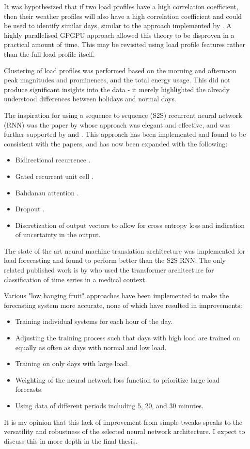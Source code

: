 It was hypothesized that if two load profiles have a high correlation coefficient, then their weather profiles will also have a high correlation coefficient and could be used to identify similar days, similar to the approach implemented by \cite{Bennett2014}.
A highly parallelised GPGPU approach allowed this theory to be disproven in a practical amount of time.
This may be revisited using load profile features rather than the full load profile itself.

Clustering of load profiles was performed based on the morning and afternoon peak magnitudes and prominences, and the total energy usage.
This did not produce significant insights into the data - it merely highlighted the already understood differences between holidays and normal days.

The inspiration for using a sequence to sequence (S2S) recurrent neural network (RNN) was the paper by \cite{Marino2016} whose approach was elegant and effective, and was further supported by \cite{Bianchi2017} and \cite{Kong2017}.
This approach has been implemented and found to be consistent with the papers, and has now been expanded with the following:
\begin{itemize}
	\item Bidirectional recurrence \citep{Schuster1997}.
	\item Gated recurrent unit cell \citep{Cho2014}.
	\item Bahdanau attention \citep{BahdanauCB14}.
	\item Dropout \citep{srivastava14a}.
	\item Discretization of output vectors to allow for cross entropy loss and indication of uncertainty in the output.
\end{itemize}

The state of the art neural machine translation architecture was implemented for load forecasting \citep{Vaswani2017} and found to perform better than the S2S RNN. The only related published work is by  \cite{Song2017} who used the transformer architecture for classification of time series in a medical context.

Various "low hanging fruit" approaches have been implemented to make the forecasting system more accurate, none of which have resulted in improvements:
\begin{itemize}
	\item Training individual systems for each hour of the day.
	\item Adjusting the training process such that days with high load are trained on equally as often as days with normal and low load.
	\item Training on only days with large load.
	\item Weighting of the neural network loss function to prioritize large load forecasts.
	\item Using data of different periods including 5, 20, and 30 minutes.
\end{itemize}
It is my opinion that this lack of improvement from simple tweaks speaks to the versatility and robustness of the selected neural network architecture.
I expect to discuss this in more depth in the final thesis.

